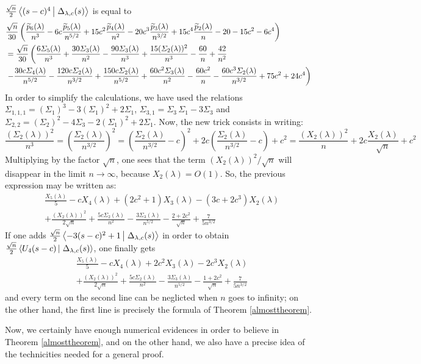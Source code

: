 \documentclass[10pt]{amsart}
\begin{document}
\begin{examples}
\begin{enumerate}
$\frac{\sqrt{n}}{2}\scal{(s-c)^{4}}{\Delta_{\lambda,c}(s)}$ is equal to
\begin{align*}
&\frac{\sqrt{n}}{30}\left(\frac{\widetilde{p}_{6}(\lambda)}{n^{3}} - 6c\frac{\widetilde{p}_{5}(\lambda)}{n^{5/2}}+15c^{2}\frac{\widetilde{p}_{4}(\lambda)}{n^{2}}-20c^{3}\frac{\widetilde{p}_{3}(\lambda)}{n^{3/2}}+15c^{4}\frac{\widetilde{p}_{2}(\lambda)}{n}-20-15c^{2}-6c^{4}\right)\\
&=\frac{\sqrt{n}}{30}\left(\frac{6\varSigma_{5}(\lambda)}{n^{3}}+\frac{30\varSigma_{3}(\lambda)}{n^{2}}-\frac{90\varSigma_{3}(\lambda)}{n^{3}}+\frac{15(\varSigma_{2}(\lambda))^{2}}{n^{3}}-\frac{60}{n}+\frac{42}{n^{2}}\right.\\
&\left.-\frac{30c\varSigma_{4}(\lambda)}{n^{5/2}}-\frac{120c\varSigma_{2}(\lambda)}{n^{3/2}}+\frac{150c\varSigma_{2}(\lambda)}{n^{5/2}} +\frac{60c^{2}\varSigma_{3}(\lambda)}{n^{2}}-\frac{60c^{2}}{n}-\frac{60c^{3}\varSigma_{2}(\lambda)}{n^{3/2}}+75c^{2}+24c^{4}\right)
\end{align*}
In order to simplify the calculations, we have used the relations $\varSigma_{1,1,1}=(\varSigma_{1})^{3}-3(\varSigma_{1})^2+2\varSigma_{1}$, $\varSigma_{3,1}=\varSigma_{3}\,\varSigma_{1}-3\varSigma_{3}$ and $\varSigma_{2,2}=(\varSigma_{2})^{2}-4\varSigma_{3}-2(\varSigma_{1})^{2}+2\varSigma_{1}$. Now, the new trick consists in writing:
$$\frac{(\varSigma_{2}(\lambda))^{2}}{n^{3}}=\left(\frac{\varSigma_{2}(\lambda)}{n^{3/2}}\right)^{2}=\left(\frac{\varSigma_{2}(\lambda)}{n^{3/2}}-c\right)^{2}+2c\left(\frac{\varSigma_{2}(\lambda)}{n^{3/2}}-c\right)+c^{2}=\frac{(X_{2}(\lambda))^{2}}{n}+2c\frac{X_{2}(\lambda)}{\sqrt{n}}+c^{2}$$
Multiplying by the factor $\sqrt{n}$, one sees that the term $(X_{2}(\lambda))^{2}/\sqrt{n}$ will disappear in the limit $n \to \infty$, because $X_{2}(\lambda)=O(1)$. So, the previous expression may be written as:
\begin{align*}&\frac{X_{5}(\lambda)}{5}-cX_{4}(\lambda)+\left(2c^{2}+1\right)X_{3}(\lambda)-(3c+2c^{3})X_{2}(\lambda)\\
&+\frac{(X_{2}(\lambda))^{2}}{2\sqrt{n}}+\frac{5c\varSigma_{2}(\lambda)}{n^{2}}-\frac{3\varSigma_{3}(\lambda)}{n^{5/2}}-\frac{2+2c^{2}}{\sqrt{n}}+\frac{7}{5n^{3/2}}
\end{align*}
If one adds $\frac{\sqrt{n}}{2}\scal{-3(s-c)^{2}+1}{\Delta_{\lambda,c}(s)}$ in order to obtain $\frac{\sqrt{n}}{2}\scal{U_{4}(s-c)}{\Delta_{\lambda,c}(s)}$, one finally gets
\begin{align*}&\frac{X_{5}(\lambda)}{5}-cX_{4}(\lambda)+2c^{2}X_{3}(\lambda)-2c^{3}X_{2}(\lambda)\\
&+\frac{(X_{2}(\lambda))^{2}}{2\sqrt{n}}+\frac{5c\varSigma_{2}(\lambda)}{n^{2}}-\frac{3\varSigma_{3}(\lambda)}{n^{5/2}}-\frac{1+2c^{2}}{\sqrt{n}}+\frac{7}{5n^{3/2}}
\end{align*}
and every term on the second line can be neglicted when $n$ goes to infinity; on the other hand, the first line is precisely the formula of Theorem \ref{almosttheorem}. 
\end{enumerate}
Now, we certainly have enough numerical evidences in order to believe in Theorem \ref{almosttheorem}, and on the other hand, we also have a precise idea of the technicities needed for a general proof.
\end{examples}\bigskip
\end{document}
